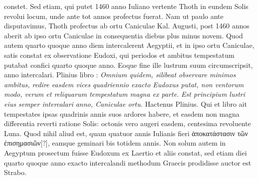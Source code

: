 constet.
Sed etiam, qui putet 1460 anno Iuliano vertente Thoth in
eundem Solis revolui locum, unde ante tot annos profectus fuerat.
Nam ut paulo ante disputavimus, Thoth profectus ab ortu Caniculae
Kal. Augusti, post 1460 annos aberit ab ipso ortu Caniculae in consequentia
diebus plus minus novem.
Quod autem quarto quoque
anno diem intercalerent Aegyptii, et in ipso ortu Caniculae, satis
constat ex observatione Eudoxi, qui periodos et ambitus tempestatum
putabat confici quarto quoque anno.
Eoque fine ille lustrum
suum circumscripsit, anno intercalari.
Plinius libro : \textit{Omnium
quidem, silibeat observare minimos ambitus, redire easdem vices quadriennio
exacto Eudoxus putat, non ventorum modo, verum et reliquarum
tempestatum magna ex parte.}
\textit{Est principium lustri eius semper intercalari
anno, Caniculae ortu.}
Hactenus Plinius.
Qui et libro  ait tempestates
ipsas quadrinis annis suos ardores habere, et easdem non magna
differentia reverti ratione Solis: octonis vero augeri easdem, centesima
revoluente Luna.
Quod nihil aliud est, quam quatuor annis Iulianis
fieri \textgreek{ἀποκατάστασιν τῶν ἐπισημασιῶν}[?], eamque geminari bis totidem
annis.
%
Non solum autem in Aegyptum prosectum fuisse Eudoxum
ex Laertio et aliis constat, sed etiam diei quarto quoque anno
exacto intercalandi methodum Graecis prodidisse auctor est Strabo.































